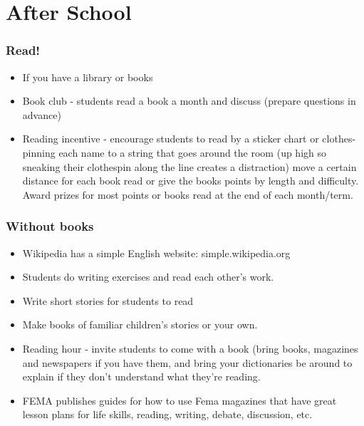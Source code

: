 \documentclass[12pt,a4paper]{report}
\begin{document}
\section{After School}

\subsubsection{Read!}
\begin{itemize}
\item{If you have a library or books}

\item{Book club - students read a book a month and discuss (prepare questions in advance)}

\item{Reading incentive - encourage students to read by a sticker chart or clothes-pinning each name to a string that goes around the room (up high so sneaking their clothespin along the line creates a distraction) move a certain distance for each book read or give the books points by length and difficulty. Award prizes for most points or books read at the end of each month/term.}

\end{itemize}

\subsubsection{Without books}
\begin{itemize}
\item{Wikipedia has a simple English website: simple.wikipedia.org}

\item{Students do writing exercises and read each other’s work.}

\item{Write short stories for students to read}

\item{Make books of familiar children’s stories or your own.}

\item{Reading hour - invite students to come with a book (bring books, magazines and newspapers if you have them, and bring your dictionaries be around to explain if they don’t understand what they're reading.}

\item{FEMA publishes guides for how to use Fema magazines that have great lesson plans for life skills, reading, writing, debate, discussion, etc.}

\end{itemize}
\end{document}
